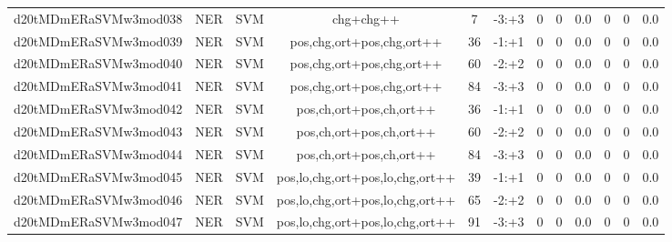 \documentclass[a4paper]{article}
\begin{document}
\begin{landscape}
\begin{center}
\begin{tabular}{ |c|c|c|c|c|c|c|c|c|c|c|c|}
 
 	
 	\small{ d20tMDmERaSVMw3mod038 } & \small{ NER} & \small{  SVM }  & chg+chg++  &  7 &  \small{  -3:+3 }  &  0 & 0 & 0.0  &  0 & 0 & 0.0 \\
 	

 
 	
 	\small{ d20tMDmERaSVMw3mod039 } & \small{ NER} & \small{  SVM }  & pos,chg,ort+pos,chg,ort++  &  36 &  \small{  -1:+1 }  &  0 & 0 & 0.0  &  0 & 0 & 0.0 \\
 	

 
 	
 	\small{ d20tMDmERaSVMw3mod040 } & \small{ NER} & \small{  SVM }  & pos,chg,ort+pos,chg,ort++  &  60 &  \small{  -2:+2 }  &  0 & 0 & 0.0  &  0 & 0 & 0.0 \\
 	

 
 	
 	\small{ d20tMDmERaSVMw3mod041 } & \small{ NER} & \small{  SVM }  & pos,chg,ort+pos,chg,ort++  &  84 &  \small{  -3:+3 }  &  0 & 0 & 0.0  &  0 & 0 & 0.0 \\
 	

 
 	
 	\small{ d20tMDmERaSVMw3mod042 } & \small{ NER} & \small{  SVM }  & pos,ch,ort+pos,ch,ort++  &  36 &  \small{  -1:+1 }  &  0 & 0 & 0.0  &  0 & 0 & 0.0 \\
 	

 
 	
 	\small{ d20tMDmERaSVMw3mod043 } & \small{ NER} & \small{  SVM }  & pos,ch,ort+pos,ch,ort++  &  60 &  \small{  -2:+2 }  &  0 & 0 & 0.0  &  0 & 0 & 0.0 \\
 	

 
 	
 	\small{ d20tMDmERaSVMw3mod044 } & \small{ NER} & \small{  SVM }  & pos,ch,ort+pos,ch,ort++  &  84 &  \small{  -3:+3 }  &  0 & 0 & 0.0  &  0 & 0 & 0.0 \\
 	

 
 	
 	\small{ d20tMDmERaSVMw3mod045 } & \small{ NER} & \small{  SVM }  & pos,lo,chg,ort+pos,lo,chg,ort++  &  39 &  \small{  -1:+1 }  &  0 & 0 & 0.0  &  0 & 0 & 0.0 \\
 	

 
 	
 	\small{ d20tMDmERaSVMw3mod046 } & \small{ NER} & \small{  SVM }  & pos,lo,chg,ort+pos,lo,chg,ort++  &  65 &  \small{  -2:+2 }  &  0 & 0 & 0.0  &  0 & 0 & 0.0 \\
 	

 
 	
 	\small{ d20tMDmERaSVMw3mod047 } & \small{ NER} & \small{  SVM }  & pos,lo,chg,ort+pos,lo,chg,ort++  &  91 &  \small{  -3:+3 }  &  0 & 0 & 0.0  &  0 & 0 & 0.0 \\
 	


\end{tabular}
\end{center}
\end{landscape}
\end{document}

